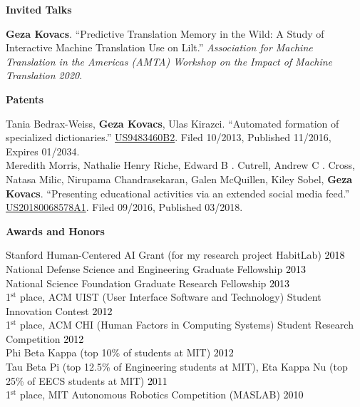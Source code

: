 \documentclass[10pt,A4]{article}
\newcommand{\cvsection}[1]
{
	\begin{center}
		\large\textcolor{sectcol}{\textbf{#1}}
	\end{center}
}
\begin{document}

\cvsection{Invited Talks}

\textbf{Geza Kovacs}. ``Predictive Translation Memory in the Wild: A Study of Interactive Machine Translation Use on Lilt.'' \emph{Association for Machine Translation in the Americas (AMTA) Workshop on the Impact of Machine Translation 2020}.\\

\pagebreak

\cvsection{Patents}

Tania Bedrax-Weiss, \textbf{Geza Kovacs}, Ulas Kirazci. ``Automated formation of specialized dictionaries.'' \href{https://patents.google.com/patent/US9483460B2}{US9483460B2}. Filed 10/2013, Published 11/2016, Expires 01/2034.\\

Meredith Morris, Nathalie Henry Riche, Edward B . Cutrell, Andrew C . Cross, Natasa Milic, Nirupama Chandrasekaran, Galen McQuillen, Kiley Sobel, \textbf{Geza Kovacs}. ``Presenting educational activities via an extended social media feed.'' \href{https://patents.google.com/patent/US20180068578A1}{US20180068578A1}. Filed 09/2016, Published 03/2018.\\

\cvsection{Awards and Honors}

Stanford Human-Centered AI Grant (for my research project HabitLab) \hfill \textcolor{black}{2018}\\ %
National Defense Science and Engineering Graduate Fellowship \hfill \textcolor{black}{2013}\\ %
National Science Foundation Graduate Research Fellowship \hfill \textcolor{black}{2013}\\ %
1$^{\textrm{st}}$ place, ACM UIST (User Interface Software and Technology) Student Innovation Contest \hfill \textcolor{black}{2012}\\
1$^{\textrm{st}}$ place, ACM CHI (Human Factors in Computing Systems) Student Research Competition \hfill \textcolor{black}{2012}\\
Phi Beta Kappa (top 10\% of students at MIT) \hfill \textcolor{black}{2012}\\
Tau Beta Pi (top 12.5\% of Engineering students at MIT), Eta Kappa Nu (top 25\% of EECS students at MIT) \hfill \textcolor{black}{2011}\\
1$^{\textrm{st}}$ place, MIT Autonomous Robotics Competition (MASLAB) \hfill \textcolor{black}{2010}\\
\end{document}
